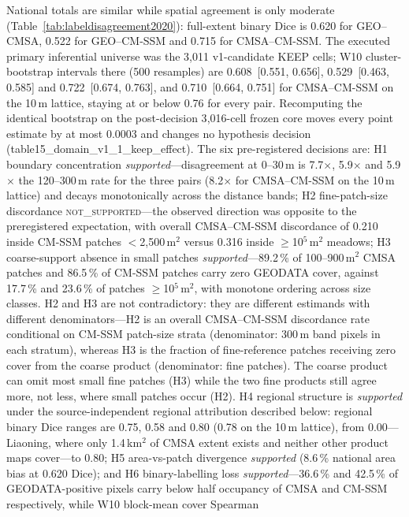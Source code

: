 National totals are similar while spatial agreement is only moderate
(Table~\ref{tab:labeldisagreement2020}): full-extent binary Dice is
0.620 for GEO--CMSA, 0.522 for GEO--CM-SSM and 0.715 for CMSA--CM-SSM.
The executed primary inferential universe was the 3{,}011
v1-candidate KEEP cells; W10 cluster-bootstrap intervals there (500
resamples) are 0.608~[0.551, 0.656], 0.529~[0.463, 0.585] and
0.722~[0.674, 0.763], and 0.710~[0.664, 0.751] for CMSA--CM-SSM on the
10\,m lattice, staying at or below 0.76 for every pair. Recomputing the
identical bootstrap on the post-decision 3{,}016-cell frozen core moves
every point estimate by at most 0.0003 and changes no hypothesis
decision (table15\_domain\_v1\_1\_keep\_effect). The six pre-registered decisions are: H1
boundary concentration \emph{supported}---disagreement at 0--30\,m is
7.7$\times$, 5.9$\times$ and 5.9$\times$ the 120--300\,m rate for the
three pairs (8.2$\times$ for CMSA--CM-SSM on the 10\,m lattice) and
decays monotonically across the distance bands; H2 fine-patch-size
discordance \textsc{not\_supported}---the observed direction was
opposite to the preregistered expectation, with overall CMSA--CM-SSM
discordance of 0.210 inside CM-SSM patches $<$2{,}500\,m$^2$ versus
0.316 inside $\geq$10$^5$\,m$^2$ meadows; H3 coarse-support absence in
small patches \emph{supported}---89.2\,\% of 100--900\,m$^2$ CMSA
patches and 86.5\,\% of CM-SSM patches carry zero GEODATA cover,
against 17.7\,\% and 23.6\,\% of patches $\geq$10$^5$\,m$^2$, with
monotone ordering across size classes. H2 and H3 are not
contradictory: they are different estimands with different
denominators---H2 is an overall CMSA--CM-SSM discordance rate
conditional on CM-SSM patch-size strata (denominator: 300\,m band
pixels in each stratum), whereas H3 is the fraction of fine-reference
patches receiving zero cover from the coarse product (denominator:
fine patches). The coarse product can omit most small fine patches
(H3) while the two fine products still agree more, not less, where
small patches occur (H2). H4 regional structure is \emph{supported}
under the source-independent regional attribution described below:
regional binary Dice ranges are 0.75, 0.58 and 0.80 (0.78 on the 10\,m
lattice), from 0.00---Liaoning, where only 1.4\,km$^2$ of CMSA extent
exists and neither other product maps cover---to 0.80; H5
area-vs-patch divergence \emph{supported} (8.6\,\% national area bias
at 0.620 Dice); and H6 binary-labelling loss \emph{supported}---36.6\,\%
and 42.5\,\% of GEODATA-positive pixels carry below half occupancy of
CMSA and CM-SSM respectively, while W10 block-mean cover Spearman
